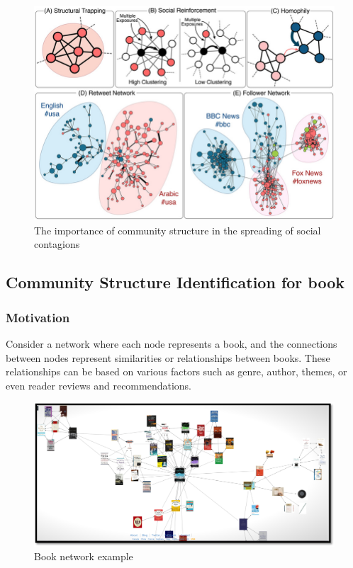 \begin{center}
\begin{figure}[!htp]
    \centering
    \includegraphics[width=0.8 \textwidth]{image/SocialNetworkApplicated.png}
    \caption{The importance of community structure in the spreading of social contagions}
    \label{subsection}
\end{figure}
\end{center}

\subsection{Community Structure Identification for book}
\subsubsection{Motivation}
Consider a network where each node represents a book, and the connections between nodes represent similarities or relationships between books. These relationships can be based on various factors such as genre, author, themes, or even reader reviews and recommendations.

\begin{center}
\begin{figure}[!htp]
    \centering
    \includegraphics[width=1 \textwidth]{image/BookNetwork.png}
    \caption{Book network example}
    \label{subsection}
\end{figure}
\end{center}\

